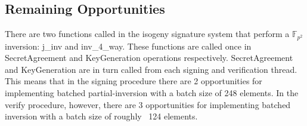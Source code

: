 \subsection{Remaining Opportunities}
There are two functions called in the isogeny signature system that perform a $\mathbb{F}_{p^{2}}$ inversion: j\_inv and inv\_4\_way. These functions are called once in SecretAgreement and KeyGeneration operations respectively. SecretAgreement and KeyGeneration are in turn called from each signing and verification thread.\\

This means that in the signing procedure there are 2 opportunities for implementing batched partial-inversion with a batch size of 248 elements. In the verify procedure, however, there are 3 opportunities for implementing batched inversion with a batch size of roughly ~124 elements.\\

